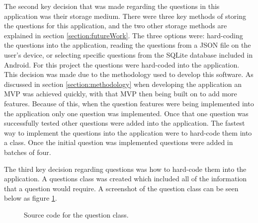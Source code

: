\documentclass{article}
\begin{document}
The second key decision that was made regarding the questions in this application was their storage medium. There were three key methods of storing the questions for this application, and the two other storage methods are explained in section \ref{section:futureWork}. The three options were: hard-coding the questions into the application, reading the questions from a JSON file on the user's device, or selecting specific questions from the SQLite database included in Android. For this project the questions were hard-coded into the application. This decision was made due to the methodology used to develop this software. As discussed in section \ref{section:methodology} when developing the application an MVP was achieved quickly, with that MVP then being built on to add more features. Because of this, when the question features were being implemented into the application only one question was implemented. Once that one question was successfully tested other questions were added into the application. The fastest way to implement the questions into the application were to hard-code them into a class. Once the initial question was implemented questions were added in batches of four. \par

The third key decision regarding questions was how to hard-code them into the application. A questions class was created which included all of the information that a question would require. A screenshot of the question class can be seen below as figure \ref{figure:questionClass}. 

\begin{figure}[H]
	\centering
	\caption{Source code for the question class.}
	\label{figure:questionClass}
\end{figure}
\end{document}
